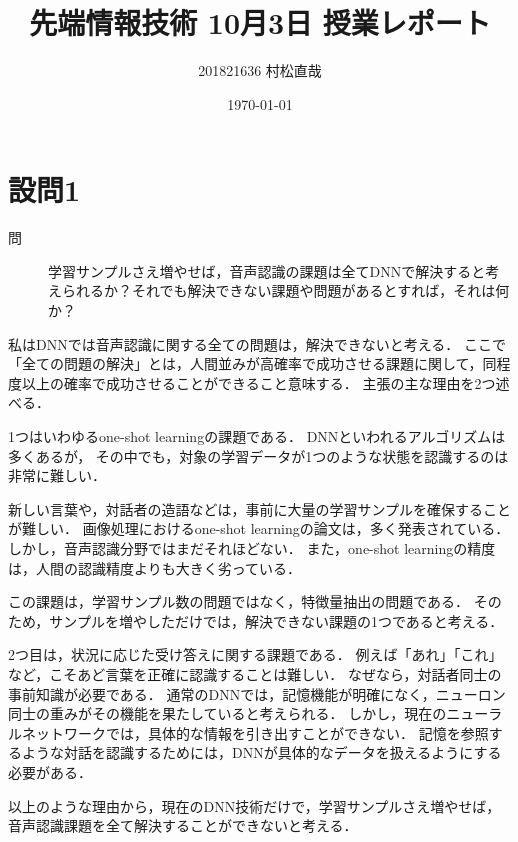 \documentclass[pdflatex,ja=standard]{bxjsarticle}
\title{先端情報技術 10月3日 授業レポート}
\author{201821636 村松直哉}
\date{\today}
\begin{document}
\maketitle
%
%
\section{設問1}
\begin{description}
 \item[問] 学習サンプルさえ増やせば，音声認識の課題は全てDNNで解決すると考えられるか？それでも解決できない課題や問題があるとすれば，それは何か？
\end{description}

私はDNNでは音声認識に関する全ての問題は，解決できないと考える．
ここで「全ての問題の解決」とは，人間並みが高確率で成功させる課題に関して，同程度以上の確率で成功させることができること意味する．
主張の主な理由を2つ述べる．


1つはいわゆるone-shot learningの課題である．
DNNといわれるアルゴリズムは多くあるが，
その中でも，対象の学習データが1つのような状態を認識するのは非常に難しい．

新しい言葉や，対話者の造語などは，事前に大量の学習サンプルを確保することが難しい．
画像処理におけるone-shot learningの論文は，多く発表されている．
しかし，音声認識分野ではまだそれほどない．
また，one-shot learningの精度は，人間の認識精度よりも大きく劣っている．

この課題は，学習サンプル数の問題ではなく，特徴量抽出の問題である．
そのため，サンプルを増やしただけでは，解決できない課題の1つであると考える．


2つ目は，状況に応じた受け答えに関する課題である．
例えば「あれ」「これ」など，こそあど言葉を正確に認識することは難しい．
なぜなら，対話者同士の事前知識が必要である．
通常のDNNでは，記憶機能が明確になく，ニューロン同士の重みがその機能を果たしていると考えられる．
しかし，現在のニューラルネットワークでは，具体的な情報を引き出すことができない．
記憶を参照するような対話を認識するためには，DNNが具体的なデータを扱えるようにする必要がある．


以上のような理由から，現在のDNN技術だけで，学習サンプルさえ増やせば，音声認識課題を全て解決することができないと考える．
\end{document}
